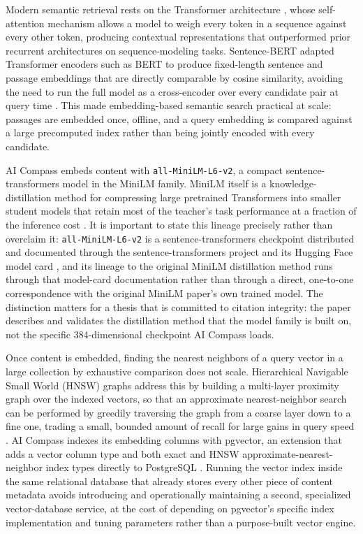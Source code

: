 Modern semantic retrieval rests on the Transformer architecture \cite{vaswani2017attention}, whose self-attention mechanism allows a model to weigh every token in a sequence against every other token, producing contextual representations that outperformed prior recurrent architectures on sequence-modeling tasks. Sentence-BERT adapted Transformer encoders such as BERT to produce fixed-length sentence and passage embeddings that are directly comparable by cosine similarity, avoiding the need to run the full model as a cross-encoder over every candidate pair at query time \cite{reimers2019sentencebert}. This made embedding-based semantic search practical at scale: passages are embedded once, offline, and a query embedding is compared against a large precomputed index rather than being jointly encoded with every candidate.

AI Compass embeds content with \texttt{all-MiniLM-L6-v2}, a compact sentence-transformers model in the MiniLM family. MiniLM itself is a knowledge-distillation method for compressing large pretrained Transformers into smaller student models that retain most of the teacher's task performance at a fraction of the inference cost \cite{wang2020minilm}. It is important to state this lineage precisely rather than overclaim it: \texttt{all-MiniLM-L6-v2} is a sentence-transformers checkpoint distributed and documented through the sentence-transformers project and its Hugging Face model card \cite{sbert_docs}, and its lineage to the original MiniLM distillation method runs through that model-card documentation rather than through a direct, one-to-one correspondence with the original MiniLM paper's own trained model. The distinction matters for a thesis that is committed to citation integrity: the paper describes and validates the distillation method that the model family is built on, not the specific 384-dimensional checkpoint AI Compass loads.

Once content is embedded, finding the nearest neighbors of a query vector in a large collection by exhaustive comparison does not scale. Hierarchical Navigable Small World (HNSW) graphs address this by building a multi-layer proximity graph over the indexed vectors, so that an approximate nearest-neighbor search can be performed by greedily traversing the graph from a coarse layer down to a fine one, trading a small, bounded amount of recall for large gains in query speed \cite{malkov2020hnsw}. AI Compass indexes its embedding columns with pgvector, an extension that adds a vector column type and both exact and HNSW approximate-nearest-neighbor index types directly to PostgreSQL \cite{pgvector}. Running the vector index inside the same relational database that already stores every other piece of content metadata avoids introducing and operationally maintaining a second, specialized vector-database service, at the cost of depending on pgvector's specific index implementation and tuning parameters rather than a purpose-built vector engine.

